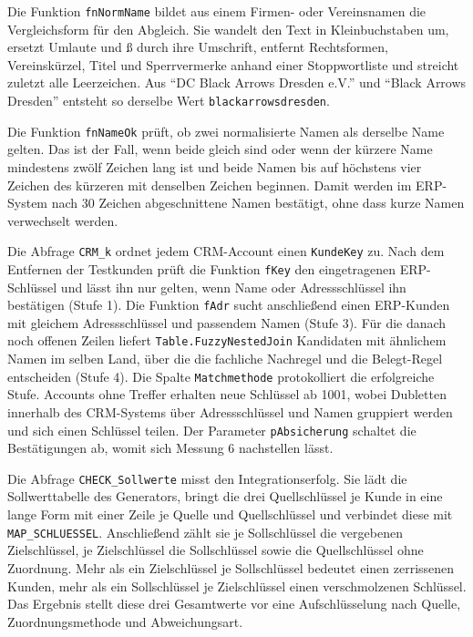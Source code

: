 \documentclass[a4paper,12pt]{article}
\newcommand{\pq}[1]{\texttt{#1}}        %
\begin{document}
Die Funktion \pq{fnNormName} bildet aus einem Firmen- oder Vereinsnamen die Vergleichsform für den Abgleich. Sie wandelt den Text in Kleinbuchstaben um, ersetzt Umlaute und ß durch ihre Umschrift, entfernt Rechtsformen, Vereinskürzel, Titel und Sperrvermerke anhand einer Stoppwortliste und streicht zuletzt alle Leerzeichen. Aus \enquote{DC Black Arrows Dresden e.V.} und \enquote{Black Arrows Dresden} entsteht so derselbe Wert \pq{blackarrowsdresden}.


Die Funktion \pq{fnNameOk} prüft, ob zwei normalisierte Namen als derselbe Name gelten. Das ist der Fall, wenn beide gleich sind oder wenn der kürzere Name mindestens zwölf Zeichen lang ist und beide Namen bis auf höchstens vier Zeichen des kürzeren mit denselben Zeichen beginnen. Damit werden im ERP-System nach 30 Zeichen abgeschnittene Namen bestätigt, ohne dass kurze Namen verwechselt werden.


Die Abfrage \pq{CRM\_k} ordnet jedem CRM-Account einen \pq{KundeKey} zu. Nach dem Entfernen der Testkunden prüft die Funktion \pq{fKey} den eingetragenen ERP-Schlüssel und lässt ihn nur gelten, wenn Name oder Adressschlüssel ihn bestätigen (Stufe 1). Die Funktion \pq{fAdr} sucht anschließend einen ERP-Kunden mit gleichem Adressschlüssel und passendem Namen (Stufe 3). Für die danach noch offenen Zeilen liefert \pq{Table.FuzzyNestedJoin} Kandidaten mit ähnlichem Namen im selben Land, über die die fachliche Nachregel und die Belegt-Regel entscheiden (Stufe 4). Die Spalte \pq{Matchmethode} protokolliert die erfolgreiche Stufe. Accounts ohne Treffer erhalten neue Schlüssel ab 1001, wobei Dubletten innerhalb des CRM-Systems über Adressschlüssel und Namen gruppiert werden und sich einen Schlüssel teilen. Der Parameter \pq{pAbsicherung} schaltet die Bestätigungen ab, womit sich Messung 6 nachstellen lässt.


Die Abfrage \pq{CHECK\_Sollwerte} misst den Integrationserfolg. Sie lädt die Sollwerttabelle des Generators, bringt die drei Quellschlüssel je Kunde in eine lange Form mit einer Zeile je Quelle und Quellschlüssel und verbindet diese mit \pq{MAP\_SCHLUESSEL}. Anschließend zählt sie je Sollschlüssel die vergebenen Zielschlüssel, je Zielschlüssel die Sollschlüssel sowie die Quellschlüssel ohne Zuordnung. Mehr als ein Zielschlüssel je Sollschlüssel bedeutet einen zerrissenen Kunden, mehr als ein Sollschlüssel je Zielschlüssel einen verschmolzenen Schlüssel. Das Ergebnis stellt diese drei Gesamtwerte vor eine Aufschlüsselung nach Quelle, Zuordnungsmethode und Abweichungsart.

\end{document}
